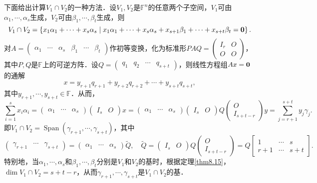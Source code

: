 \documentclass[a4paper,fontset=windows]{ctexbook}
\theoremstyle{definition}
\DeclareMathOperator{\Span}{Span}
\begin{document}
下面给出计算$V_1\cap V_2$的一种方法．设$V_1,V_2$是$\mathbb{F}^n$的任意两个子空间，$V_1$可由$\alpha_1,\cdots,\alpha_s$生成，$V_2$可由$\beta_1,\cdots,\beta_t$生成，则
$$V_1\cap V_2=\left\{x_1\alpha_1+\cdots+x_s\alpha_s\mid x_1\alpha_1+\cdots+x_s\alpha_s+x_{s+1}\beta_1+\cdots+x_{s+t}\beta_t={\bf 0}\right\}.$$
对$A=\begin{pmatrix}\alpha_1&\cdots&\alpha_s&\beta_1&\cdots&\beta_t\end{pmatrix}$作初等变换，化为标准形$PAQ=\begin{pmatrix}I_r&O \\ O&O\end{pmatrix}$，其中$P,Q$是$\mathbb{F}$上的可逆方阵．设$Q=\begin{pmatrix}q_1&q_2&\cdots&q_{s+t}\end{pmatrix}$，则线性方程组$Ax={\bf 0}$的通解
$$x=y_{r+1}q_{r+1}+y_{r+2}q_{r+2}+\cdots+y_{s+t}q_{s+t},$$
其中$y_{r+1},\cdots,y_{s+t}\in\mathbb{F}$．从而，
$$\sum_{i=1}^sx_i\alpha_i=\begin{pmatrix}\alpha_1&\cdots&\alpha_s\end{pmatrix}\begin{pmatrix}I_s&O\end{pmatrix}x=\begin{pmatrix}\alpha_1&\cdots&\alpha_s\end{pmatrix}\begin{pmatrix}I_s&O\end{pmatrix}Q\begin{pmatrix}O \\ I_{s+t-r}\end{pmatrix}y=\sum_{j=r+1}^{s+t}y_j\gamma_j.$$
即$V_1\cap V_2=\Span(\gamma_{r+1},\cdots,\gamma_{s+t})$，其中
$$\begin{pmatrix}\gamma_{r+1}&\cdots&\gamma_{s+t}\end{pmatrix}=\begin{pmatrix}\alpha_1&\cdots&\alpha_s\end{pmatrix}\widetilde{Q},\quad\widetilde{Q}=\begin{pmatrix}I_s&O\end{pmatrix}Q\begin{pmatrix}O \\ I_{s+t-r}\end{pmatrix}=Q[\begin{smallmatrix}1&\cdots&s \\ r+1&\cdots&s+t\end{smallmatrix}].$$
特别地，当$\alpha_1,\cdots,\alpha_s$和$\beta_1,\cdots,\beta_t$分别是$V_1$和$V_2$的基时，根据定理\ref{thm8.15}，$\dim V_1\cap V_2=s+t-r$，从而$\gamma_{r+1},\cdots,\gamma_{s+t}$是$V_1\cap V_2$的基．
\end{document}
